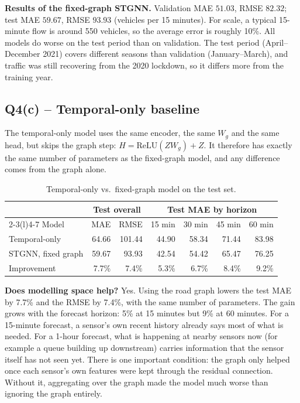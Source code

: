 \documentclass[11pt, a4paper]{article}
\begin{document}
\textbf{Results of the fixed-graph STGNN.} Validation MAE $51.03$, RMSE $82.32$; test MAE $59.67$, RMSE $93.93$ (vehicles per 15 minutes). For scale, a typical 15-minute flow is around 550 vehicles, so the average error is roughly 10\%. All models do worse on the test period than on validation. The test period (April--December 2021) covers different seasons than validation (January--March), and traffic was still recovering from the 2020 lockdown, so it differs more from the training year.

\subsection*{Q4(c) -- Temporal-only baseline}

The temporal-only model uses the same encoder, the same $W_g$ and the same head, but skips the graph step: $H = \mathrm{ReLU}(Z W_g) + Z$. It therefore has exactly the same number of parameters as the fixed-graph model, and any difference comes from the graph alone.

\begin{table}[H]
\centering
\small
\begin{tabular}{@{}lrrrrrr@{}}
\toprule
& \multicolumn{2}{c}{Test overall} & \multicolumn{4}{c}{Test MAE by horizon} \\
\cmidrule(lr){2-3}\cmidrule(l){4-7}
Model & MAE & RMSE & 15 min & 30 min & 45 min & 60 min \\
\midrule
Temporal-only     & 64.66 & 101.44 & 44.90 & 58.34 & 71.44 & 83.98 \\
STGNN, fixed graph & 59.67 & 93.93  & 42.54 & 54.42 & 65.47 & 76.25 \\
\midrule
Improvement        & 7.7\% & 7.4\% & 5.3\% & 6.7\% & 8.4\% & 9.2\% \\
\bottomrule
\end{tabular}
\caption{Temporal-only vs.\ fixed-graph model on the test set.}
\end{table}

\textbf{Does modelling space help?} Yes. Using the road graph lowers the test MAE by 7.7\% and the RMSE by 7.4\%, with the same number of parameters. The gain grows with the forecast horizon: 5\% at 15 minutes but 9\% at 60 minutes. For a 15-minute forecast, a sensor's own recent history already says most of what is needed. For a 1-hour forecast, what is happening at nearby sensors now (for example a queue building up downstream) carries information that the sensor itself has not seen yet. There is one important condition: the graph only helped once each sensor's own features were kept through the residual connection. Without it, aggregating over the graph made the model much worse than ignoring the graph entirely.
\end{document}
